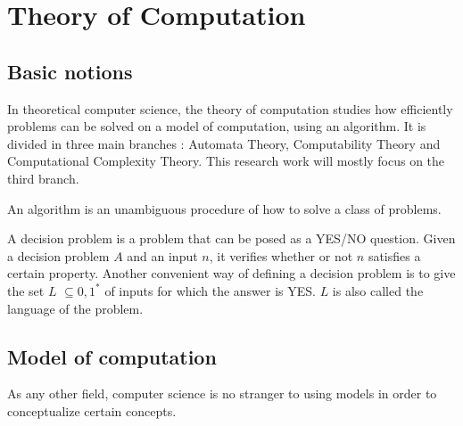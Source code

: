 \section{Theory of Computation}
\subsection{Basic notions}

In theoretical computer science, the theory of computation studies how efficiently problems can be solved on a model of computation, using an algorithm. It is divided in three main branches : Automata Theory, Computability Theory and Computational Complexity Theory. This research work will mostly focus on the third branch. 

\begin{defn}
An algorithm is an unambiguous procedure of how to solve a class of problems.
\end{defn}

\begin{defn}
A decision problem is a problem that can be posed as a YES/NO question. Given a decision problem $A$ and an input $n$, it verifies whether or not $n$ satisfies a certain property. 
Another convenient way of defining a decision problem is to give the set $L$ $\subseteq {0,1}^*$ of inputs for which the answer is YES.  $L$ is also called the language of the problem. 
\end{defn}

\subsection{Model of computation}
As any other field, computer science is no stranger to using models in order to conceptualize certain concepts.


